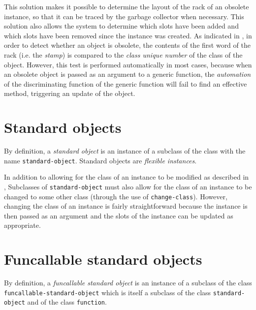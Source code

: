 This solution makes it possible to determine the layout of the
rack of an obsolete instance, so that it can be traced by
the garbage collector when necessary.  This solution also allows the
system to determine which slots have been added and which slots have
been removed since the instance was created.  As indicated in
, in order to detect
whether an object is obsolete, the contents of the first word of the
rack (i.e. the \emph{stamp}) is compared to the
\emph{class unique number} of the class of the object.  However, this
test is performed automatically in most cases, because when an
obsolete object is passed as an argument to a generic function, the
\emph{automation} of the discriminating function of the generic
function will fail to find an effective method, triggering an update
of the object.

\section{Standard objects}
\label{sec-data-representation-standard-objects}

By definition, a \emph{standard object} is an instance of a subclass
of the class with the name \texttt{standard-object}.  Standard objects
are \emph{flexible instances}.

In addition to allowing for the class of an instance to be modified as
described in ,
Subclasses of \texttt{standard-object} must also allow for the class
of an instance to be changed to some other class (through the use of
\texttt{change-class}).  However, changing the class of an instance is
fairly straightforward because the instance is then passed as an
argument and the slots of the instance can be updated as appropriate.

\section{Funcallable standard objects}
\label{sec-data-representation-funcallable-standard-objects}

By definition, a \emph{funcallable standard object} is an instance of
a subclass of the class \texttt{funcallable-standard-object} which is
itself a subclass of the class \texttt{standard-object}
 and of the class
\texttt{function}. 

